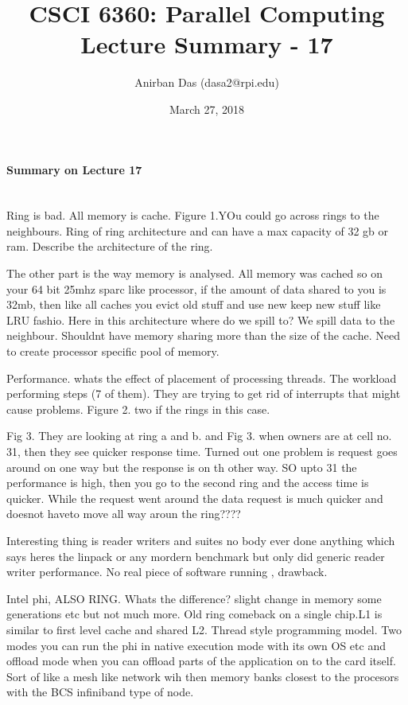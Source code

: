 \documentclass[a4paper,12 pt]{article}
\title{\vspace{-2.0cm}CSCI 6360: Parallel Computing Lecture Summary - 17}
\author{Anirban Das (dasa2@rpi.edu) }
\date{March 27, 2018}
\begin{document}
\maketitle

\paragraph{Summary on Lecture 17\\\\}

Ring is bad. All memory is cache. Figure 1.YOu could go across rings to the neighbours. Ring of ring architecture and can have a max capacity of 32 gb or ram. Describe the architecture of the ring.

The other part is the way memory is analysed. All memory was cached so on your 64 bit 25mhz sparc like processor, if the amount of data shared to you is 32mb, then like all caches you evict old stuff and use new keep new stuff like LRU fashio. Here in this architecture where do we spill to? We spill data to the neighbour. Shouldnt have memory sharing more than the size of the cache. Need to create processor specific pool of memory. 

Performance. whats the effect of placement of processing threads. The workload performing steps (7 of them). They are trying to get rid of interrupts that might cause problems. Figure 2. two if the rings in this case.

Fig 3. They are looking at ring a and b. and Fig 3. when owners are at cell no. 31, then they see quicker response time. Turned out one problem is request goes around on one way but the response is on th other way. SO upto 31 the performance is high, then you go to the second ring and the access time is quicker. While the request went around the data request is much quicker and doesnot haveto move all way aroun the ring????

Interesting thing is reader writers and suites no body ever done anything which says heres the linpack or any mordern benchmark but only did generic reader writer performance. No real piece of software running , drawback.



Intel phi, ALSO RING. Whats the difference? slight change in memory some generations etc but not much more. Old ring comeback on a single chip.L1 is similar to first level cache and shared L2. Thread style programming model. Two modes you can run the phi in native execution mode with its own OS etc and offload mode when you can offload parts of the application on to the card itself. Sort of like a mesh like network wih then memory banks closest to the procesors with the BCS infiniband type of node. 
\end{document}

